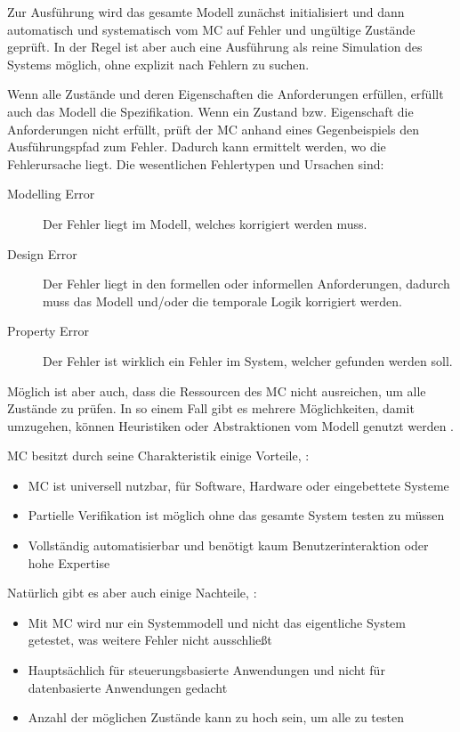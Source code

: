 Zur Ausführung wird das gesamte Modell zunächst initialisiert und dann automatisch und systematisch vom MC auf Fehler und ungültige Zustände geprüft. In der Regel ist aber auch eine Ausführung als reine Simulation des Systems möglich, ohne explizit nach Fehlern zu suchen.

Wenn alle Zustände und deren Eigenschaften die Anforderungen erfüllen, erfüllt auch das Modell die Spezifikation. Wenn ein Zustand bzw. Eigenschaft die Anforderungen nicht erfüllt, prüft der MC anhand eines Gegenbeispiels den Ausführungspfad zum Fehler. Dadurch kann ermittelt werden, wo die Fehlerursache liegt. Die wesentlichen Fehlertypen und Ursachen sind:

\begin{description}
	\item[Modelling Error] Der Fehler liegt im Modell, welches korrigiert werden muss.
	\item[Design Error] Der Fehler liegt in den formellen oder informellen Anforderungen, dadurch muss das Modell und/oder die temporale Logik korrigiert werden.
	\item[Property Error] Der Fehler ist wirklich ein Fehler im System, welcher gefunden werden soll.
\end{description}

Möglich ist aber auch, dass die Ressourcen des MC nicht ausreichen, um alle Zustände zu prüfen. In so einem Fall gibt es mehrere Möglichkeiten, damit umzugehen, \zB können Heuristiken oder Abstraktionen vom Modell genutzt werden \cite{Baier2008,Eberhardinger2016}.

MC besitzt durch seine Charakteristik einige Vorteile, \uA \cite{Baier2008}:
\begin{itemize}[noitemsep]
	\item MC ist universell nutzbar, \zB für Software, Hardware oder eingebettete Systeme
	\item Partielle Verifikation ist möglich ohne das gesamte System testen zu müssen
	\item Vollständig automatisierbar und benötigt kaum Benutzerinteraktion oder hohe Expertise
\end{itemize}

Natürlich gibt es aber auch einige Nachteile, \uA \cite{Baier2008}:
\begin{itemize}[noitemsep]
	\item Mit MC wird nur ein Systemmodell und nicht das eigentliche System getestet, was weitere Fehler nicht ausschließt
	\item Hauptsächlich für steuerungsbasierte Anwendungen und nicht für datenbasierte Anwendungen gedacht
	\item Anzahl der möglichen Zustände kann zu hoch sein, um alle zu testen
\end{itemize}